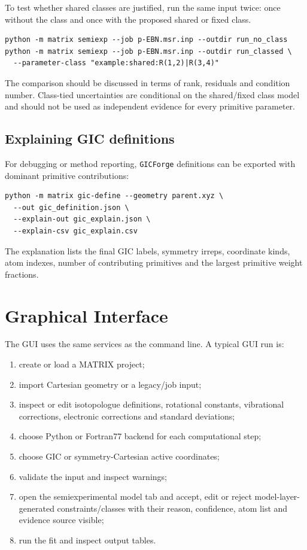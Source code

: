 \documentclass[11pt]{article}
\newcommand{\gicforge}{\texttt{GICForge}}
\begin{document}
To test whether shared classes are justified, run the same input twice: once
without the class and once with the proposed shared or fixed class.

\begin{lstlisting}[style=oracle]
python -m matrix semiexp --job p-EBN.msr.inp --outdir run_no_class
python -m matrix semiexp --job p-EBN.msr.inp --outdir run_classed \
  --parameter-class "example:shared:R(1,2)|R(3,4)"
\end{lstlisting}

\noindent
The comparison should be discussed in terms of rank, residuals and condition
number.  Class-tied uncertainties are conditional on the shared/fixed class
model and should not be used as independent evidence for every primitive
parameter.

\subsection{Explaining GIC definitions}

For debugging or method reporting, \gicforge{} definitions can be exported with
dominant primitive contributions:

\begin{lstlisting}[style=oracle]
python -m matrix gic-define --geometry parent.xyz \
  --out gic_definition.json \
  --explain-out gic_explain.json \
  --explain-csv gic_explain.csv
\end{lstlisting}

\noindent
The explanation lists the final GIC labels, symmetry irreps, coordinate kinds,
atom indexes, number of contributing primitives and the largest primitive
weight fractions.

\section{Graphical Interface}

The GUI uses the same services as the command line.  A typical GUI run is:

\begin{enumerate}
  \item create or load a MATRIX project;
  \item import Cartesian geometry or a legacy/job input;
  \item inspect or edit isotopologue definitions, rotational constants,
        vibrational corrections, electronic corrections and standard
        deviations;
  \item choose Python or Fortran77 backend for each computational step;
  \item choose GIC or symmetry-Cartesian active coordinates;
  \item validate the input and inspect warnings;
  \item open the semiexperimental model tab and accept, edit or reject model-layer-generated
        constraints/classes with their reason, confidence, atom list and
        evidence source visible;
  \item run the fit and inspect output tables.
\end{enumerate}
\end{document}
